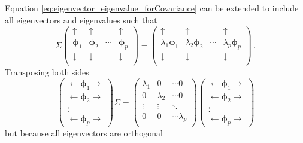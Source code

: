\documentclass[12pt]{report}
\newcommand{\vectGreek}[1]{\boldsymbol{#1}}
\newcommand{\matr}[1]{\mathsf{#1}}
\begin{document}
Equation \eqref{eq:eigenvector_eigenvalue_forCovariance} can be extended to include all eigenvectors and eigenvalues such that
\begin{equation}
\matr{\Sigma}
	\begin{pmatrix}
		\uparrow & \uparrow & & \uparrow \\
		\vectGreek{\phi}_1 & \vectGreek{\phi}_2 &\cdots& \vectGreek{\phi}_p \\
		\downarrow & \downarrow & & \downarrow \\
	\end{pmatrix}
=
	\begin{pmatrix}
		\uparrow & \uparrow & & \uparrow \\
		\lambda_1\vectGreek{\phi}_1 & \lambda_2\vectGreek{\phi}_2 &\cdots& \lambda_p\vectGreek{\phi}_p \\
		\downarrow & \downarrow & & \downarrow \\
	\end{pmatrix} \ .
\end{equation}
Transposing both sides
\begin{equation*}
\begin{pmatrix}
	\leftarrow\vectGreek{\phi}_1\rightarrow \\
	\leftarrow\vectGreek{\phi}_2\rightarrow \\
	\vdots \\
	\leftarrow\vectGreek{\phi}_p\rightarrow
\end{pmatrix}
\matr{\Sigma}
=
\begin{pmatrix}
	\lambda_1 & 0 & \cdots 0 \\
	0 & \lambda_2 & \cdots 0 \\
	\vdots & \vdots & \ddots \\
	0 & 0 & \cdots \lambda_p \\
\end{pmatrix}
\begin{pmatrix}
	\leftarrow\vectGreek{\phi}_1\rightarrow \\
	\leftarrow\vectGreek{\phi}_2\rightarrow \\
	\vdots \\
	\leftarrow\vectGreek{\phi}_p\rightarrow
\end{pmatrix}
\end{equation*}
but because all eigenvectors are orthogonal
\end{document}

